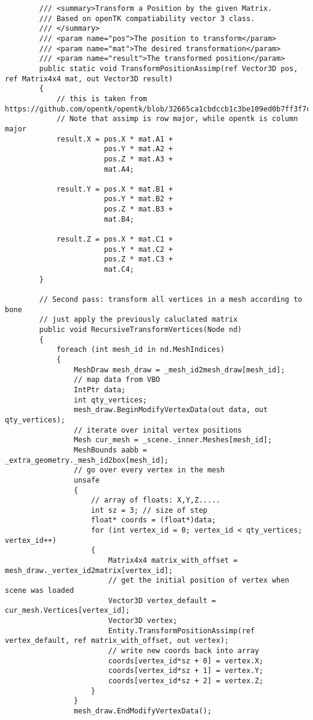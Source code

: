 \begin{scriptsize}
\begin{verbatim}
        /// <summary>Transform a Position by the given Matrix.
        /// Based on openTK compatiability vector 3 class.
        /// </summary>
        /// <param name="pos">The position to transform</param>
        /// <param name="mat">The desired transformation</param>
        /// <param name="result">The transformed position</param>
        public static void TransformPositionAssimp(ref Vector3D pos, ref Matrix4x4 mat, out Vector3D result)
        {
            // this is taken from https://github.com/opentk/opentk/blob/32665ca1cbdccb1c3be109ed0b7ff3f7cb5cb5b7/Source/Compatibility/Math/Vector3.cs
            // Note that assimp is row major, while opentk is column major
            result.X = pos.X * mat.A1 +
                       pos.Y * mat.A2 +
                       pos.Z * mat.A3 +
                       mat.A4;

            result.Y = pos.X * mat.B1 +
                       pos.Y * mat.B2 +
                       pos.Z * mat.B3 +
                       mat.B4;

            result.Z = pos.X * mat.C1 +
                       pos.Y * mat.C2 +
                       pos.Z * mat.C3 +
                       mat.C4;
        }

        // Second pass: transform all vertices in a mesh according to bone
        // just apply the previously caluclated matrix
        public void RecursiveTransformVertices(Node nd)
        {
            foreach (int mesh_id in nd.MeshIndices)
            {
                MeshDraw mesh_draw = _mesh_id2mesh_draw[mesh_id];
                // map data from VBO
                IntPtr data;
                int qty_vertices;
                mesh_draw.BeginModifyVertexData(out data, out qty_vertices);
                // iterate over inital vertex positions
                Mesh cur_mesh = _scene._inner.Meshes[mesh_id];
                MeshBounds aabb = _extra_geometry._mesh_id2box[mesh_id];
                // go over every vertex in the mesh
                unsafe
                {
                    // array of floats: X,Y,Z.....
                    int sz = 3; // size of step
                    float* coords = (float*)data;
                    for (int vertex_id = 0; vertex_id < qty_vertices; vertex_id++)
                    {
                        Matrix4x4 matrix_with_offset = mesh_draw._vertex_id2matrix[vertex_id];
                        // get the initial position of vertex when scene was loaded
                        Vector3D vertex_default = cur_mesh.Vertices[vertex_id];
                        Vector3D vertex;
                        Entity.TransformPositionAssimp(ref vertex_default, ref matrix_with_offset, out vertex);
                        // write new coords back into array
                        coords[vertex_id*sz + 0] = vertex.X;
                        coords[vertex_id*sz + 1] = vertex.Y;
                        coords[vertex_id*sz + 2] = vertex.Z;
                    }
                }
                mesh_draw.EndModifyVertexData();


\end{verbatim}
\end{scriptsize}
